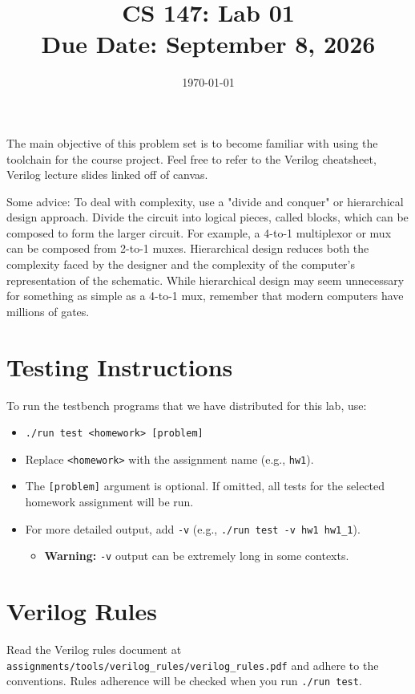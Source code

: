\documentclass[12pt]{article}
\title{CS 147: Lab 01 \\ Due Date: September 8, 2026}
\author{}
\date{\today}
\begin{document}
\maketitle
The main objective of this problem set is to become familiar with using the toolchain for the course project.  
Feel free to refer
to the Verilog cheatsheet, Verilog lecture slides linked off of canvas. 

Some advice:  To deal with complexity, use a "divide and conquer" or hierarchical design approach. Divide the circuit into logical pieces, called blocks, which can be composed to form the larger circuit. For example, a 4-to-1 multiplexor or mux can be composed from 2-to-1 muxes. Hierarchical design reduces both the complexity faced by the designer and the complexity of the computer's representation of the schematic. While hierarchical design may seem unnecessary for something as simple as a 4-to-1 mux, remember that modern computers have millions of gates.

\section*{Testing Instructions}

To run the testbench programs that we have distributed for this lab, use:
\begin{itemize}
\item \texttt{./run test <homework> [problem]}
\item Replace \texttt{<homework>} with the assignment name (e.g., \texttt{hw1}).
\item The \texttt{[problem]} argument is optional. If omitted, all tests for the selected homework assignment will be run.
\item For more detailed output, add \texttt{-v} (e.g., \texttt{./run test -v hw1 hw1\_1}).
\begin{itemize}
\item \textbf{Warning:} \texttt{-v} output can be extremely long in some contexts.
\end{itemize}
\end{itemize}

\section*{Verilog Rules}
Read the Verilog rules document at \texttt{assignments/tools/verilog\_rules/verilog\_rules.pdf} and adhere to the conventions.
Rules adherence will be checked when you run \texttt{./run test}.
\end{document}
